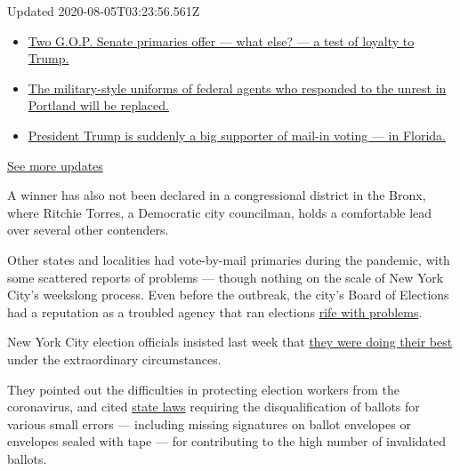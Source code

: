 Updated 2020-08-05T03:23:56.561Z

\begin{itemize}
\tightlist
\item
  \href{https://www.nytimes3xbfgragh.onion/2020/08/04/us/elections/primary-election-michigan-arizona-kansas.html?action=click\&pgtype=Article\&state=default\&region=MAIN_CONTENT_1\&context=storylines_live_updates\#link-3924dd44}{Two
  G.O.P. Senate primaries offer --- what else? --- a test of loyalty to
  Trump.}
\item
  \href{https://www.nytimes3xbfgragh.onion/2020/08/04/us/elections/primary-election-michigan-arizona-kansas.html?action=click\&pgtype=Article\&state=default\&region=MAIN_CONTENT_1\&context=storylines_live_updates\#link-62a8e06b}{The
  military-style uniforms of federal agents who responded to the unrest
  in Portland will be replaced.}
\item
  \href{https://www.nytimes3xbfgragh.onion/2020/08/04/us/elections/primary-election-michigan-arizona-kansas.html?action=click\&pgtype=Article\&state=default\&region=MAIN_CONTENT_1\&context=storylines_live_updates\#link-32b39e33}{President
  Trump is suddenly a big supporter of mail-in voting --- in Florida.}
\end{itemize}

\href{https://www.nytimes3xbfgragh.onion/2020/08/04/us/elections/primary-election-michigan-arizona-kansas.html?action=click\&pgtype=Article\&state=default\&region=MAIN_CONTENT_1\&context=storylines_live_updates}{See
more updates}

A winner has also not been declared in a congressional district in the
Bronx, where Ritchie Torres, a Democratic city councilman, holds a
comfortable lead over several other contenders.

Other states and localities had vote-by-mail primaries during the
pandemic, with some scattered reports of problems --- though nothing on
the scale of New York City's weekslong process. Even before the
outbreak, the city's Board of Elections had a reputation as a troubled
agency that ran elections
\href{https://www.nytimes3xbfgragh.onion/2018/11/07/nyregion/voting-problems-nyc-.html}{rife
with problems}.

New York City election officials insisted last week that
\href{https://www.nytimes3xbfgragh.onion/2020/07/17/nyregion/election-absentee-ballots-primary.html}{they
were doing their best} under the extraordinary circumstances.

They pointed out the difficulties in protecting election workers from
the coronavirus, and cited
\href{https://www.nysenate.gov/legislation/laws/ELN/9-209}{state laws}
requiring the disqualification of ballots for various small errors ---
including missing signatures on ballot envelopes or envelopes sealed
with tape --- for contributing to the high number of invalidated
ballots.

